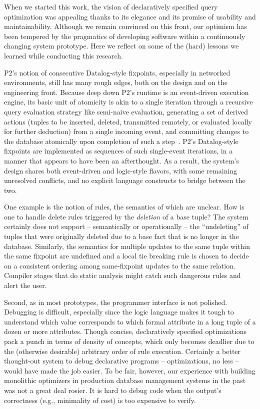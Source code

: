 When we started this work, the vision of declaratively specified
query optimization was appealing thanks to its elegance and its
promise of usability and maintainability.  Although we remain convinced on this front, our optimism has been tempered by the pragmatics of developing software within a
continuously changing system prototype.  Here we reflect on some
of the (hard) lessons we learned while conducting this research.


P2's notion of
consecutive Datalog-style fixpoints, especially in networked
environments, still has many rough edges, both on the design and on the
engineering front.  Because deep down P2's runtime is an event-driven execution
engine, its basic unit of atomicity is akin to a single iteration through a recursive query evaluation strategy like semi-naive evaluation, generating a set of derived actions (tuples to be inserted, deleted, transmitted
remotely, or evaluated locally for further deduction) from a single incoming event, and committing changes to the database atomically upon completion of such a step~\cite{LuThesis}. P2's
Datalog-style fixpoints are implemented as sequences of such
single-event iterations, in a manner that appears to have been an afterthought. As a result, the system's
design shares both 
event-driven and logic-style flavors, with some remaining unresolved
conflicts, and no explicit language constructs to bridge between the two.

One example is the notion of  rules, the semantics of which are unclear.  How is one to handle delete rules triggered by the
\emph{deletion} of a base tuple?  The system certainly does not support
-- semantically or operationally -- the ``undeleting'' of tuples that were
originally deleted due to a base fact that is no longer in the
database.  Similarly, the semantics for multiple updates to
the same tuple within the same fixpoint are undefined and a local tie
breaking rule is chosen to decide on a consistent ordering among
same-fixpoint updates to the same relation. Compiler
stages that do static analysis might catch such dangerous rules and alert the user.

Second, as in most prototypes, the programmer interface is not
polished. Debugging is difficult, especially since the logic language
makes it tough to understand which value corresponds to which formal
attribute in a long tuple of a dozen or more attributes.  Though
concise, declaratively specified optimizations pack a punch in terms of
density of concepts, which only becomes deadlier due to the (otherwise
desirable) arbitrary order of rule execution.  Certainly a better
thought-out system to debug declarative programs -- optimizations, no
less -- would have made the job easier.  To be fair, however, our
experience with building monolithic optimizers in production database
management systems in the past was not a great deal rosier.  It is hard to debug code when the output's correctness (e.g., minimality of cost) is too expensive to verify.

